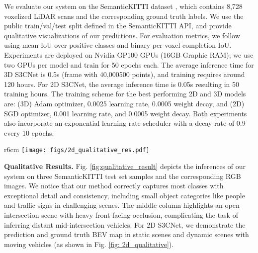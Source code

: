 \documentclass{article}
\begin{document}
We evaluate our system on the SemanticKITTI dataset \cite{behley2019semantickitti}, which contains 8,728 voxelized LiDAR scans and the corresponding ground truth labels. We use the public train/val/test split defined in the SemanticKITTI API, and provide qualitative visualizations of our predictions. For evaluation metrics, we follow  \cite{song2017semantic} using mean IoU over positive classes and binary per-voxel completion IoU. Experiments are deployed on Nvidia GP100 GPUs (16GB Graphic RAM); we use two GPUs per model and train for 50 epochs each. The average inference time for 3D S3CNet is 0.5s (frame with 40,000500 points), and training requires around 120 hours. For 2D S3CNet, the average inference time is 0.05s resulting in 50 training hours. The training scheme for the best performing 2D and 3D models are: (3D) Adam optimizer, 0.0025 learning rate, 0.0005 weight decay, and (2D) SGD optimizer, 0.001 learning rate, and 0.0005 weight decay. Both experiments also incorporate an exponential learning rate scheduler with a decay rate of 0.9 every 10 epochs.


\setlength{\columnsep}{5pt}\begin{wrapfigure}{r}{6cm}
  \centering
  \texttt{[image: figs/2d\_qualitative\_res.pdf]}
\captionsetup{font=scriptsize,labelfont=scriptsize}
  \caption{2D qualitative results.}
  \label{fig: 2d_qualitative}
  \vspace{-10px}
\end{wrapfigure}

\textbf{Qualitative Results.} Fig. \ref{fig:qualitative_result} depicts the inferences of our system on three SemanticKITTI test set samples and the corresponding RGB images. We notice that our method correctly captures most classes with exceptional detail and consistency, including small object categories like people and traffic signs in challenging scenes. The middle column highlights an open intersection scene with heavy front-facing occlusion, complicating the task of inferring distant mid-intersection vehicles. For 2D S3CNet, we demonstrate the prediction and ground truth BEV map in static scenes and dynamic scenes with moving vehicles (as shown in Fig. \ref{fig: 2d_qualitative}).
\end{document}

